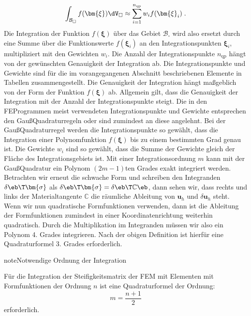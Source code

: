 \documentclass[letterpaper,10pt,german]{jupyterBook}
\begin{document}
\begin{equation*}
\begin{split}\int_{\mathcal{B}_{\square}} f(\bm{\xi}) \dV_{\square} \approx \sum_{i=1}^{n_{\text{qp}}} w_i f(\bm{\xi}_i) \; .\end{split}
\end{equation*}
\sphinxAtStartPar
Die Integration der Funktion \(f(\bm{\xi})\) über das Gebiet \(\mathcal{B}_{\square}\) wird also ersetzt durch eine Summe über die Funktionswerte \(f(\bm{\xi}_i)\) an den Integrationspunkten \(\bm{\xi}_i\), multipliziert mit den Gewichten \(w_i\). Die Anzahl der Integrationspunkte \(n_{\text{qp}}\) hängt von der gewünschten Genauigkeit der Integration ab. Die Integrationspunkte und Gewichte sind für die im vorangegangenen Abschnitt beschriebenen Elemente in Tabellen zusammengestellt. Die Genauigkeit der Integration hängt maßgeblich von der Form der Funktion \(f(\bm{\xi})\) ab. Allgemein gilt, dass die Genauigkeit der Integration mit der Anzahl der Integrationspunkte steigt. Die in den FE\sphinxhyphen{}Programmen meist verwendeten Integrationspunkte und Gewichte entsprechen den Gauß\sphinxhyphen{}Quadraturregeln oder sind zumindest an diese angelehnt. Bei der Gauß\sphinxhyphen{}Quadraturregel werden die Integrationspunkte so gewählt, dass die Integration einer Polynomfunktion \(f(\bm{\xi})\) bis zu einem bestimmten Grad genau ist. Die Gewichte \(w_i\) sind so gewählt, dass die Summe der Gewichte gleich der Fläche des Integrationsgebiets ist. Mit einer Integrationsordnung \(m\) kann mit der Gauß\sphinxhyphen{}Quadratur ein Polynom \((2m - 1)\)\sphinxhyphen{}ten Grades exakt integriert werden. Betrachten wir erneut die schwache Form und schreiben den Integranden \(\delta\eb\T  \bm{\sigma}\) als \(\delta\eb\T  \bm{\sigma} = \delta\eb\T  \mathbb{C} \eb\), dann sehen wir, dass rechts und links der Materialtangente \(\mathbb{C}\) die räumliche Ableitung von \(\bm{u}_h\) und \(\delta\bm{u}_h\) steht. Wenn wir nun quadratische Formfunktionen verwenden, dann ist die Ableitung der Formfunktionen zumindest in einer Koordinatenrichtung weiterhin quadratisch. Durch die Multiplikation im Integranden müssen wir also ein Polynom 4. Grades integrieren. Nach der obigen Definition ist hierfür eine Quadraturformel 3. Grades erforderlich.

\begin{sphinxadmonition}{note}{Notwendige Ordnung der Integration}

\sphinxAtStartPar
Für die Integration der Steifigkeitsmatrix der FEM mit Elementen mit Formfunktionen der Ordnung \(n\) ist eine Quadraturformel der Ordnung:
\begin{equation*}
 m = \frac{n+1}{2} 
 \end{equation*}
\sphinxAtStartPar
erforderlich.
\end{sphinxadmonition}
\end{document}
